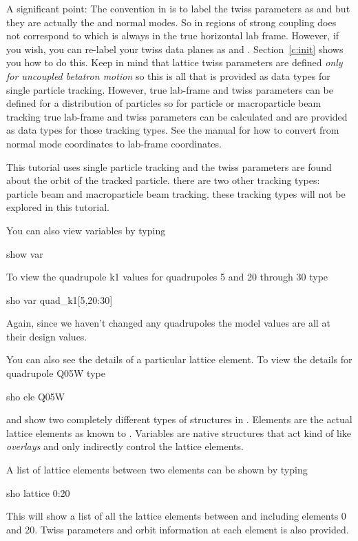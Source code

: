 A significant point: The convention in \bmad is to label the twiss
parameters as  and  but they are actually the  and
 normal modes. So in regions of strong coupling  does
not correspond to  which is always in the true horizontal
lab frame.  However, if you wish, you can re-label your twiss data
planes as  and .  Section~\ref{c:init} shows you how to do
this. Keep in mind that lattice twiss parameters are defined
\textit{only for uncoupled betatron motion} so this is all that is
provided as data types for single particle tracking.  However, true
lab-frame  and  twiss parameters can be defined for a
distribution of particles so for particle or macroparticle beam
tracking true lab-frame  and  twiss parameters can be
calculated and are provided as data types for those tracking
types. See the \bmad manual for how to convert from normal mode
coordinates to lab-frame coordinates.

This tutorial uses single particle tracking and the twiss parameters
are found about the orbit of the tracked particle. there are two other
tracking types: particle beam and macroparticle beam tracking. these
tracking types will not be explored in this tutorial.

You can also view variables by typing
\begin{example}
  show var
\end{example}
To view the quadrupole k1 values for \cesr quadrupoles 5 and 20
through 30 type
\begin{example}
  sho var quad\_k1[5,20:30]
\end{example}
Again, since we haven't changed any quadrupoles the model values are
all at their design values.

You can also see the details of a particular lattice element. To view
the details for quadrupole Q05W type
\begin{example}
  sho ele Q05W
\end{example}

 and  show two completely different types of
structures in \tao. Elements are the actual lattice elements as known
to \bmad.  Variables are native \tao structures that act kind of like
\bmad \textit{overlays} and only indirectly control the lattice
elements.

A list of lattice elements between two elements can be shown by typing 
\begin{example}
  sho lattice 0:20
\end{example}
This will show a list of all the lattice elements between and
including elements 0 and 20. Twiss parameters and orbit information at
each element is also provided.

